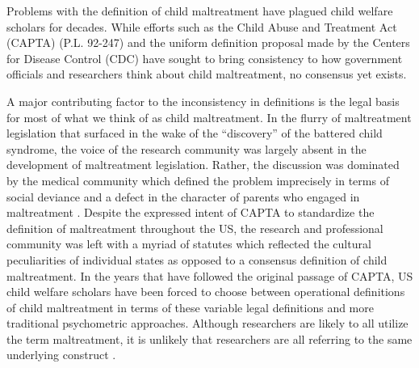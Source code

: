\documentclass[1p, review]{elsarticle}\usepackage[]{graphicx}\usepackage[]{color}
\begin{document}
Problems with the definition of child maltreatment have plagued child welfare scholars for decades. While efforts such as the Child Abuse and Treatment Act (CAPTA) (P.L. 92-247) and the uniform definition proposal made by the Centers for Disease Control (CDC) \citep{Leeb2008} have sought to bring consistency to how government officials and researchers think about child maltreatment, no consensus yet exists.

A major contributing factor to the inconsistency in definitions is the legal basis for most of what we think of as child maltreatment. In the flurry of maltreatment legislation that surfaced in the wake of the \citet{Kempe1962} ``discovery'' of the battered child syndrome, the voice of the research community was largely absent in the development of maltreatment legislation. Rather, the discussion was dominated by the medical community which defined the problem imprecisely in terms of social deviance and a defect in the character of parents who engaged in maltreatment \citep{Nelson1986}. Despite the expressed intent of CAPTA to standardize the definition of maltreatment throughout the US, the research and professional community was left with a myriad of statutes which reflected the cultural peculiarities of individual states as opposed to a consensus definition of child maltreatment. In the years that have followed the original passage of CAPTA, US child welfare scholars have been forced to choose between operational definitions of child maltreatment in terms of these variable legal definitions and more traditional psychometric approaches. Although researchers are likely to all utilize the term maltreatment, it is unlikely that researchers are all referring to the same underlying construct \citep{Runyan2005}. 
\end{document}

